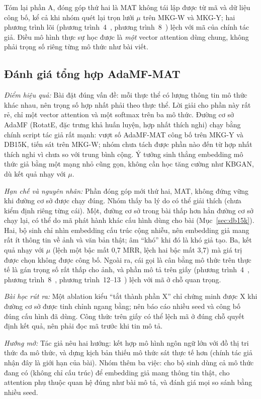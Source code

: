 \documentclass[conference]{IEEEtran}
\newcommand{\hlg}[1]{{\sethlcolor{hlgreen}\hl{#1}}}
\renewcommand{\hl}[1]{#1}
\begin{document}
Tóm lại phần A, đóng góp thứ hai là MAT không tái lập được từ mã và dữ liệu công bố, kể cả khi
nhóm quét lại trọn lưới $\mu$ trên MKG-W và MKG-Y; hai phương trình lõi (phương trình~4~\cite{adamfmat}, phương trình~8~\cite{adamfmat}) lệch với mã
của chính tác giả. \hlg{Điều mô hình} thực sự học được là \emph{một} vector attention
dùng chung, không phải trọng số riêng từng mô thức như bài viết.

\subsection{Đánh giá tổng hợp AdaMF-MAT}
\label{sec:adamf-eval}
\textit{Điểm hiệu quả:} Bài đặt đúng vấn đề: mỗi thực thể có lượng thông tin mô thức khác nhau, nên
trọng số hợp nhất phải theo thực thể. Lời giải cho phần này rất rẻ, chỉ một vector attention và một
softmax trên ba mô thức. Đường cơ sở AdaMF (RotatE, đặc trưng khả huấn luyện, hợp nhất thích nghi) chạy
bằng chính script tác giả rất mạnh: vượt số AdaMF-MAT công bố trên MKG-Y và DB15K, tiến sát trên MKG-W;
nhóm chưa tách được phần nào đến từ hợp nhất thích nghi vì chưa so với trung bình cộng. Ý tưởng sinh
thẳng embedding mô thức giả bằng một mạng nhỏ cũng gọn, không cần học tăng cường như KBGAN, dù kết quả
nhạy với $\mu$.

\textit{Hạn chế và nguyên nhân:} Phần đóng góp mới thứ hai, MAT, không đứng vững khi đường cơ sở được chạy
đúng. Nhóm thấy ba lý do có thể giải thích (chưa kiểm định riêng từng cái). Một, đường cơ sở trong
bài thấp hơn hẳn đường cơ sở chạy lại, có thể do mã phát hành khác cấu hình dùng cho bài
(Mục~\ref{sec:db15k}). Hai, bộ sinh chỉ nhìn embedding cấu trúc cộng nhiễu, nên embedding giả mang rất ít thông
tin về ảnh và văn bản thật; âm ``khó'' khi đó là khó giả tạo. Ba, kết quả nhạy với $\mu$ (lệch một bậc mất
0,7 MRR, lệch hai bậc mất 3,7) mà giá trị được chọn không được công bố. Ngoài ra, cái gọi là cân bằng mô thức trên
thực tế là gán trọng số rất thấp cho ảnh, và phần mô tả trên giấy (phương trình~4~\cite{adamfmat}, phương trình~8~\cite{adamfmat}, phương trình~12--13~\cite{adamfmat}) lệch với mã ở chỗ
quan trọng.

\textit{Bài học rút ra:} Một ablation kiểu ``tắt thành phần X'' chỉ chứng minh được X khi đường cơ sở được
tinh chỉnh ngang bằng; nên báo cáo nhiều seed và công bố đúng cấu hình đã dùng. Công thức trên giấy
có thể lệch mã ở đúng chỗ quyết định kết quả, nên phải đọc mã trước khi tin mô tả.

\textit{Hướng mở:} Tác giả nêu hai hướng: kết hợp mô hình ngôn ngữ lớn với đồ thị tri thức đa mô thức,
và dựng kịch bản thiếu mô thức sát thực tế hơn (chính tác giả nhận đây là giới hạn của bài). Nhóm
thêm ba việc: cho bộ sinh dùng cả mô thức đang có (không chỉ cấu trúc) để embedding giả mang thông tin
thật, cho attention phụ thuộc quan hệ đúng như bài mô tả, và đánh giá mọi so sánh bằng nhiều seed.
\end{document}
